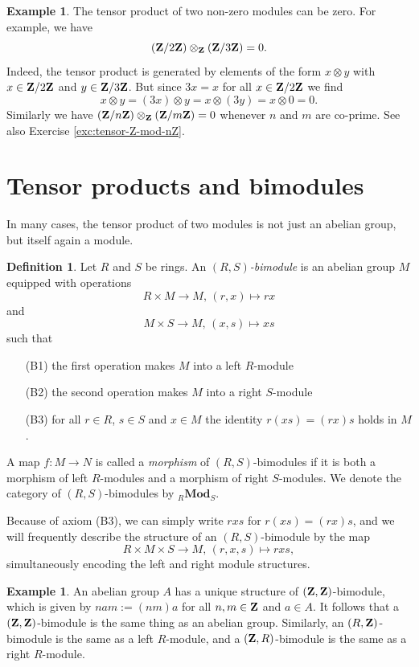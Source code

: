 \documentclass[11pt]{amsbook}
\DeclareMathOperator\Mod{{\bf{Mod}}}
\def\Mod{\mathbf{Mod}}
\theoremstyle{plain}
\theoremstyle{definition}
\newtheorem{definition}[theorem]{Definition}
\newtheorem{example}[theorem]{Example}
\begin{document}
\begin{example}
The tensor product of two non-zero modules can be zero. For example, we have
\[
	({\mathbf{Z}}/2{\mathbf{Z}}) \otimes_{\mathbf{Z}} ({\mathbf{Z}}/3{\mathbf{Z}}) = 0.
\]
Indeed, the tensor product is generated by elements of the form $x\otimes y$ with $x\in {\mathbf{Z}}/2{\mathbf{Z}}$ and $y\in {\mathbf{Z}}/3{\mathbf{Z}}$. But since
$3x=x$ for all $x\in {\mathbf{Z}}/2{\mathbf{Z}}$ we find 
\[
	x\otimes y = (3x) \otimes y  = x \otimes (3y) = x\otimes 0 =  0.
\]
Similarly we have $({\mathbf{Z}}/n{\mathbf{Z}})\otimes_{\mathbf{Z}} ({\mathbf{Z}}/m{\mathbf{Z}})=0$ whenever $n$ and $m$ are co-prime. See also Exercise \ref{exc:tensor-Z-mod-nZ}.
\end{example}


\section{Tensor products and bimodules}

In many cases, the tensor product of two modules is not just an abelian group, but itself again a module. 

\begin{definition}
Let $R$ and $S$ be rings.
An \emph{$(R,S)$-bimodule} is an abelian group $M$ equipped with operations
\[
	R\times M \to M,\, (r,x) \mapsto rx
\]
and 
\[
	M \times S \to M,\, (x,s) \mapsto xs
\]
such that 
\begin{enumerate}
\item[(B1)] the first operation makes $M$ into a left $R$-module 
\item[(B2)] the second operation makes $M$ into a right $S$-module
\item[(B3)] for all $r\in R$, $s\in S$ and $x\in M$ the identity $r(xs)=(rx)s$ holds in $M$.
\end{enumerate}
A map  $f\colon M \to N$  is called a \emph{morphism} of $(R,S)$-bimodules if it is both a morphism
of left $R$-modules and a morphism of right $S$-modules. We denote the category of $(R,S)$-bimodules by ${}_R\Mod_S$.
\end{definition}

Because of axiom (B3), we can simply write $rxs$ for $r(xs)=(rx)s$, and we will frequently describe the structure of an $(R,S)$-bimodule by the map
\[
	R\times M \times S \to M,\, (r,x,s) \mapsto rxs,
\]
simultaneously encoding the left and right module structures.

\begin{example}An abelian group $A$ has a unique structure of $({\mathbf{Z}},{\mathbf{Z}})$-bimodule, which is given by 
$nam := (nm)a$ for all $n,m\in {\mathbf{Z}}$ and $a\in A$. It follows that a $({\mathbf{Z}},{\mathbf{Z}})$-bimodule is the same thing as an abelian group. Similarly, an $(R,{\mathbf{Z}})$-bimodule is the same as a left $R$-module, and a $({\mathbf{Z}},R)$-bimodule is the same as a right $R$-module.
\end{example}
\end{document}
